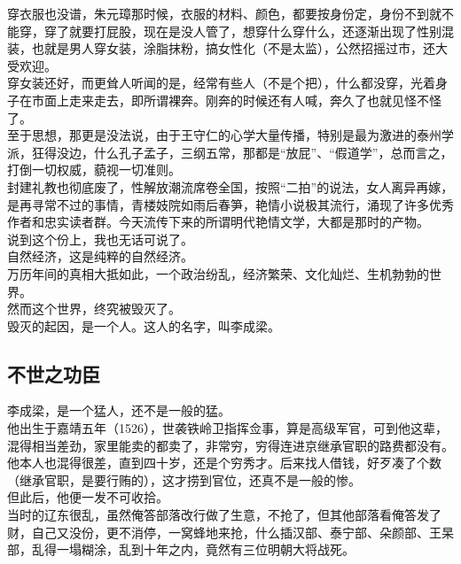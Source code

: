 \begin{multicols}{\theparacolNo}
穿衣服也没谱，朱元璋那时候，衣服的材料、颜色，都要按身份定，身份不到就不能穿，穿了就要打屁股，现在是没人管了，想穿什么穿什么，还逐渐出现了性别混装，也就是男人穿女装，涂脂抹粉，搞女性化（不是太监），公然招摇过市，还大受欢迎。\\

穿女装还好，而更耸人听闻的是，经常有些人（不是个把），什么都没穿，光着身子在市面上走来走去，即所谓裸奔。刚奔的时候还有人喊，奔久了也就见怪不怪了。\\

至于思想，那更是没法说，由于王守仁的心学大量传播，特别是最为激进的泰州学派，狂得没边，什么孔子孟子，三纲五常，那都是“放屁”、“假道学”，总而言之，打倒一切权威，藐视一切准则。\\

封建礼教也彻底废了，性解放潮流席卷全国，按照“二拍”的说法，女人离异再嫁，是再寻常不过的事情，青楼妓院如雨后春笋，艳情小说极其流行，涌现了许多优秀作者和忠实读者群。今天流传下来的所谓明代艳情文学，大都是那时的产物。\\

说到这个份上，我也无话可说了。\\

自然经济，这是纯粹的自然经济。\\

万历年间的真相大抵如此，一个政治纷乱，经济繁荣、文化灿烂、生机勃勃的世界。\\

然而这个世界，终究被毁灭了。\\

毁灭的起因，是一个人。这人的名字，叫李成梁。\\

\subsection{不世之功臣}
李成梁，是一个猛人，还不是一般的猛。\\

他出生于嘉靖五年（1526），世袭铁岭卫指挥佥事，算是高级军官，可到他这辈，混得相当差劲，家里能卖的都卖了，非常穷，穷得连进京继承官职的路费都没有。\\

他本人也混得很差，直到四十岁，还是个穷秀才。后来找人借钱，好歹凑了个数（继承官职，是要行贿的），这才捞到官位，还真不是一般的惨。\\

但此后，他便一发不可收拾。\\

当时的辽东很乱，虽然俺答部落改行做了生意，不抢了，但其他部落看俺答发了财，自己又没份，更不消停，一窝蜂地来抢，什么插汉部、泰宁部、朵颜部、王杲部，乱得一塌糊涂，乱到十年之内，竟然有三位明朝大将战死。\\


\end{multicols}
